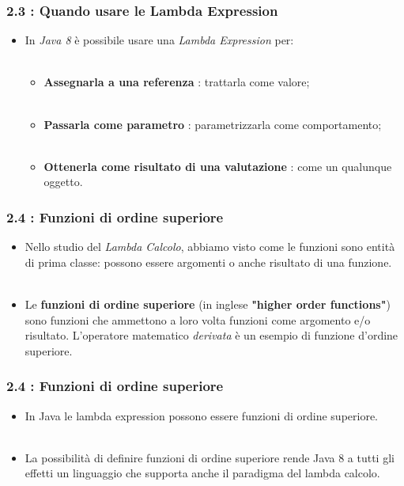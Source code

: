 \documentclass{beamer}
\begin{document}
\begin{frame}
\frametitle{\textbf{2.3 : Quando usare le Lambda Expression}}
\begin{itemize}
	\item
	In \textit{Java 8} \`e possibile usare una \textit{Lambda Expression} per:\\\
	\begin{itemize}
		\item
		\textbf{Assegnarla a una referenza} : trattarla come valore;\\\
		\item
		\textbf{Passarla come parametro} : parametrizzarla come comportamento;\\\
		\item
		\textbf{Ottenerla come risultato di una valutazione} : come un qualunque oggetto.
	\end{itemize}
\end{itemize}
\end{frame}


\begin{frame}
	\frametitle{\textbf{2.4 : Funzioni di ordine superiore}}
	\begin{itemize}
		\item
			Nello studio del \textit{Lambda Calcolo}, abbiamo visto come le funzioni sono entità di prima classe: possono essere argomenti o anche risultato di una funzione.\\\
		\item
			Le \textbf{funzioni di ordine superiore} (in inglese \textbf{"higher order functions"}) sono funzioni che ammettono a loro volta funzioni come argomento e/o risultato. L'operatore matematico \emph{derivata} \`e un esempio di funzione d'ordine superiore.
	\end{itemize}
\end{frame}



\begin{frame}
	\frametitle{\textbf{2.4 : Funzioni di ordine superiore}}
\begin{itemize}
	\item
	In Java le lambda expression possono essere funzioni di ordine superiore.\\\
	\item
	La possibilit\`a di definire funzioni di ordine superiore rende Java 8 a tutti gli effetti un linguaggio che supporta anche il paradigma del lambda calcolo.
\end{itemize}
\end{frame}
\end{document}
